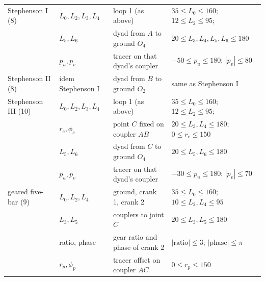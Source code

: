 \begin{table}[H]
\begin{tabular}{@{}llll@{}}
Stephenson I (8) & $L_0,L_2,L_3,L_4$ & loop 1 (as above) & $35\!\le\!L_0\!\le\!160$; $12\!\le\!L_2\!\le\!95$; \\
 & $L_5,L_6$ & dyad from $A$ to ground $O_4$ & $20\!\le\!L_3,L_4,L_5,L_6\!\le\!180$ \\
 & $p_u,p_v$ & tracer on that dyad's coupler & $-50\!\le\!p_u\!\le\!180$; $|p_v|\!\le\!80$ \\
Stephenson II (8) & idem Stephenson I & dyad from $B$ to ground $O_2$ & same as Stephenson I \\
Stephenson III (10) & $L_0,L_2,L_3,L_4$ & loop 1 (as above) & $35\!\le\!L_0\!\le\!160$; $12\!\le\!L_2\!\le\!95$; \\
 & $r_c,\phi_c$ & point $C$ fixed on coupler $AB$ & $20\!\le\!L_3,L_4\!\le\!180$; $0\!\le\!r_c\!\le\!150$ \\
 & $L_5,L_6$ & dyad from $C$ to ground $O_4$ & $20\!\le\!L_5,L_6\!\le\!180$ \\
 & $p_u,p_v$ & tracer on that dyad's coupler & $-30\!\le\!p_u\!\le\!180$; $|p_v|\!\le\!70$ \\
geared five-bar (9) & $L_0,L_2,L_4$ & ground, crank 1, crank 2 & $35\!\le\!L_0\!\le\!160$; $10\!\le\!L_2,L_4\!\le\!95$ \\
 & $L_3,L_5$ & couplers to joint $C$ & $20\!\le\!L_3,L_5\!\le\!180$ \\
 & ratio, phase & gear ratio and phase of crank 2 & $|\mathrm{ratio}|\!\le\!3$; $|\mathrm{phase}|\!\le\!\pi$ \\
 & $r_p,\phi_p$ & tracer offset on coupler $AC$ & $0\!\le\!r_p\!\le\!150$ \\ \hline
\end{tabular}
\end{table}

